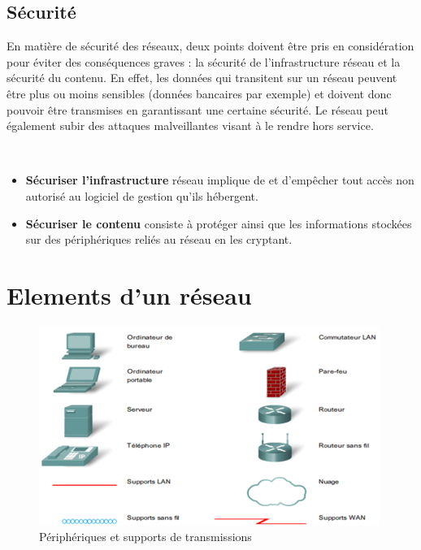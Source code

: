 \documentclass[10pt,fleqn]{article} %
\begin{document}
\subsection{Sécurité}
En matière de sécurité des réseaux, deux points doivent être pris en considération pour éviter des conséquences graves : la sécurité de l'infrastructure réseau et la sécurité du contenu.
En effet, les données qui transitent sur un réseau peuvent être plus ou moins sensibles (données bancaires par exemple) et doivent donc pouvoir être transmises en garantissant une certaine sécurité.
Le réseau peut également subir des attaques malveillantes visant à le rendre hors service.
\begin{aretenir}~
  \begin{itemize}
    \item \textbf{Sécuriser l'infrastructure} réseau implique de  et d'empêcher tout accès non autorisé au logiciel de gestion qu'ils hébergent.
    \item \textbf{Sécuriser le contenu} consiste à protéger  ainsi que les informations stockées sur des périphériques reliés au réseau en les cryptant.
  \end{itemize}
\end{aretenir}
\section{Elements d'un réseau}
\begin{figure}[h]
  \centering
  \includegraphics[height=.3\textheight]{img/reseau_peripheriques}
  \caption{Périphériques et supports de transmissions}
\end{figure}
\end{document}
